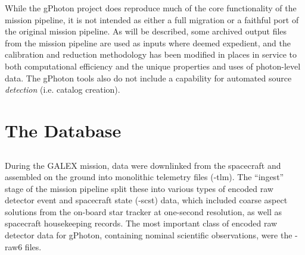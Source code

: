 \documentclass[trackchanges,preprint2]{aastex}
\begin{document}
While the gPhoton project does reproduce much of the core functionality of the mission pipeline, it is not intended as either a full migration or a faithful port of the original mission pipeline. As will be described, some archived output files from the mission pipeline are used as inputs where deemed expedient, and the calibration and reduction methodology has been modified in places in service to both computational efficiency and the unique properties and uses of photon-level data. The gPhoton tools also do not include a capability for automated source \emph{detection} (i.e. catalog creation).

\section{The Database}
\label{database}
\subsection{}
During the GALEX mission, data were downlinked from the spacecraft and assembled on the ground into monolithic telemetry files (-tlm). The ``ingest'' stage of the mission pipeline split these into various types of encoded raw detector event and spacecraft state (-scst) data, which included coarse aspect solutions from the on-board star tracker at one-second resolution, as well as spacecraft housekeeping records. The most important class of encoded raw detector data for gPhoton, containing nominal scientific observations, were the -raw6 files. 
\end{document}
